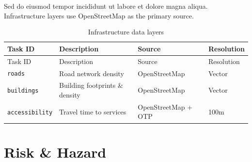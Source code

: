 \documentclass[
  letterpaper,
  DIV=11,
  numbers=noendperiod]{scrreprt}
\begin{document}
Sed do eiusmod tempor incididunt ut labore et dolore magna aliqua.
Infrastructure layers use OpenStreetMap as the primary source.

\begin{longtable}[]{@{}
  >{\raggedright\arraybackslash}p{}
  >{\raggedright\arraybackslash}p{}
  >{\raggedright\arraybackslash}p{}
  >{\raggedright\arraybackslash}p{}@{}}
\caption{Infrastructure data
layers}\label{tbl-infrastructure}\tabularnewline
\toprule\noalign{}
\begin{minipage}[b]{\linewidth}\raggedright
Task ID
\end{minipage} & \begin{minipage}[b]{\linewidth}\raggedright
Description
\end{minipage} & \begin{minipage}[b]{\linewidth}\raggedright
Source
\end{minipage} & \begin{minipage}[b]{\linewidth}\raggedright
Resolution
\end{minipage} \\
\midrule\noalign{}
\endfirsthead
\toprule\noalign{}
\begin{minipage}[b]{\linewidth}\raggedright
Task ID
\end{minipage} & \begin{minipage}[b]{\linewidth}\raggedright
Description
\end{minipage} & \begin{minipage}[b]{\linewidth}\raggedright
Source
\end{minipage} & \begin{minipage}[b]{\linewidth}\raggedright
Resolution
\end{minipage} \\
\midrule\noalign{}
\endhead
\bottomrule\noalign{}
\endlastfoot
\texttt{roads} & Road network density & OpenStreetMap & Vector \\
\texttt{buildings} & Building footprints \& density & OpenStreetMap &
Vector \\
\texttt{accessibility} & Travel time to services & OpenStreetMap + OTP &
100m \\
\end{longtable}

\section{Risk \& Hazard}\label{risk-hazard}
\end{document}
